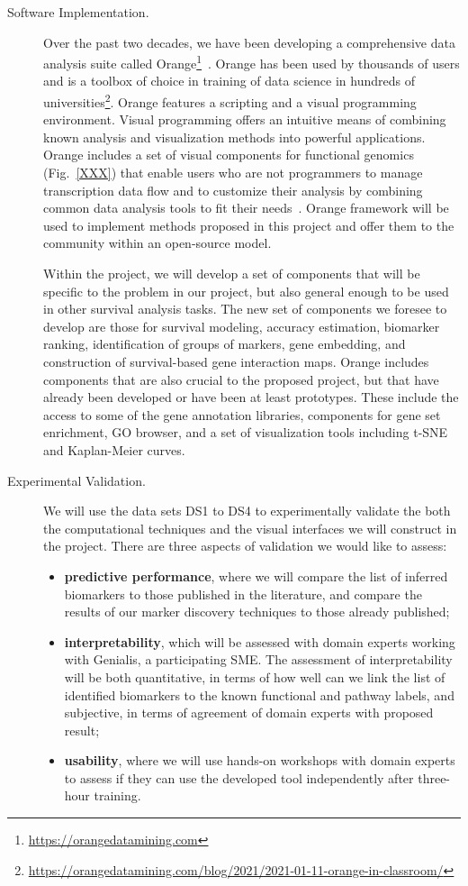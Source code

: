 \documentclass[11pt,a4paper]{article}
\newcommand{\myurl}[1]{\footnote{\url{#1}}}
\renewcommand{\bold}{\textbf}
\begin{document}
\begin{description}
	\item[Software Implementation.] Over the past two decades, we have been developing a comprehensive data analysis suite called Orange\myurl{https://orangedatamining.com}~\cite{}. Orange has been used by thousands of users and is a toolbox of choice in training of data science in hundreds of universities\myurl{https://orangedatamining.com/blog/2021/2021-01-11-orange-in-classroom/}. Orange features a scripting and a visual programming environment. Visual programming offers an intuitive means of combining known analysis and visualization methods into powerful applications. Orange includes a set of visual components for functional genomics (Fig.~\ref{XXX}) that enable users who are not programmers to manage transcription data flow and to customize their analysis by combining common data analysis tools to fit their needs~\cite{}. Orange framework will be used to implement methods proposed in this project and offer them to the community within an open-source model.

	Within the project, we will develop a set of components that will be specific to the problem in our project, but also general enough to be used in other survival analysis tasks. The new set of components we foresee to develop are those for survival modeling, accuracy estimation, biomarker ranking, identification of groups of markers, gene embedding, and construction of survival-based gene interaction maps. Orange includes components that are also crucial to the proposed project, but that have already been developed or have been at least prototypes. These include the access to some of the gene annotation libraries, components for gene set enrichment, GO browser, and a set of visualization tools including t-SNE and Kaplan-Meier curves.

	\item[Experimental Validation.] We will use the data sets DS1 to DS4 to experimentally validate the both the computational techniques and the visual interfaces we will construct in the project. There are three aspects of validation we would like to assess:
	\begin{itemize} 
		\item \bold{predictive performance}, where we will compare the list of inferred biomarkers to those published in the literature, and compare the results of our marker discovery techniques to those already published;
		\item \bold{interpretability}, which will be assessed with domain experts working with Genialis, a participating SME. The assessment of interpretability will be both quantitative, in terms of how well can we link the list of identified biomarkers to the known functional and pathway labels, and subjective, in terms of agreement of domain experts with proposed result;
		\item \bold{usability}, where we will use hands-on workshops with domain experts to assess if they can use the developed tool independently after three-hour training.
	\end{itemize}
\end{description}
\end{document}
